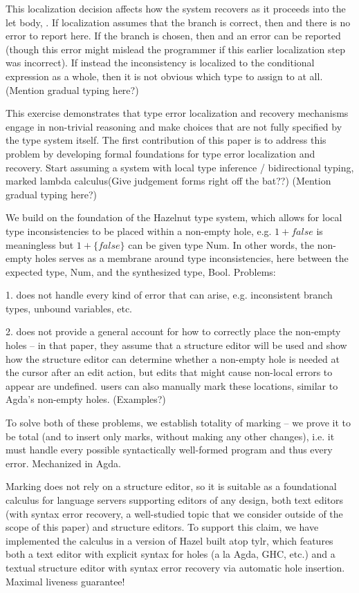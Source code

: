 This localization decision affects how the system recovers as it proceeds into the let body, . 
If localization assumes that the  branch is correct, then  and there is no error to report here.
If the  branch is chosen, then  and an error can be reported (though this error might mislead the programmer if this earlier localization step was incorrect). 
If instead the inconsistency is localized to the conditional expression as a whole, then it is not obvious which type to assign to  at all. (Mention gradual typing here?)

This exercise demonstrates that type error localization and recovery mechanisms engage in non-trivial reasoning and make choices that are not fully specified by the type system itself. 
The first contribution of this paper is to address this problem by developing formal foundations for type error localization and recovery. 
Start assuming a system with local type inference / bidirectional typing, marked lambda calculus(Give judgement forms right off the bat??) 
(Mention gradual typing here?)

We build on the foundation of the Hazelnut type system, which allows for local type inconsistencies to be placed within a non-empty hole, 
e.g. $1 + false$ is meaningless but $1 + \{false\}$ can be given type Num. In other words, the non-empty holes serves as a membrane around type inconsistencies, here between the expected type, Num, and the synthesized type, Bool. Problems:

1. does not handle every kind of error that can arise, e.g. inconsistent branch types, unbound variables, etc.

2. does not provide a general account for how to correctly place the non-empty holes -- in that paper, they assume that a structure editor will be used and show how the structure editor can determine whether a non-empty hole is needed at the cursor after an edit action, but edits that might cause non-local errors to appear are undefined. users can also manually mark these locations, similar to Agda's non-empty holes. (Examples?)

To solve both of these problems, we establish totality of marking -- we prove it to be total (and to insert only marks, without making any other changes), i.e. it must handle 
every possible syntactically well-formed program and thus every error. Mechanized in Agda.

Marking does not rely on a structure editor, so it is suitable as a foundational calculus for language servers supporting editors of any 
design, both text editors (with syntax error recovery, a well-studied topic that we consider outside of the scope of this paper) and structure editors. To support this claim, we have implemented the calculus in a version of Hazel built atop tylr, which features both a text editor with explicit syntax for holes (a la Agda, GHC, etc.) and a textual structure editor with syntax error recovery via automatic hole insertion. Maximal liveness guarantee! 

